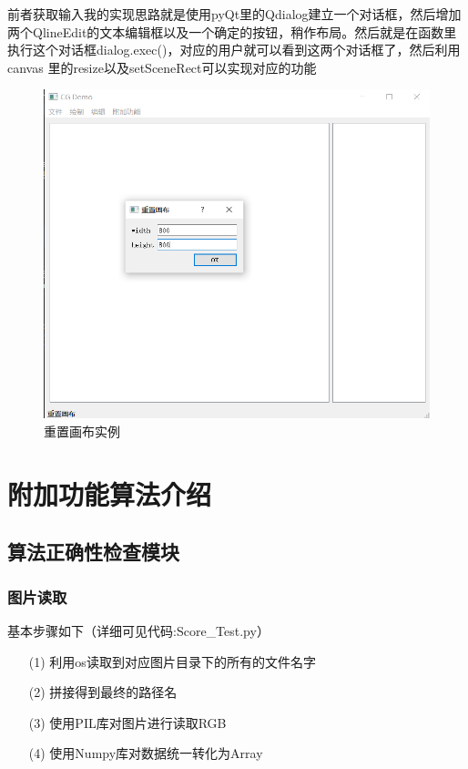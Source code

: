 \documentclass[a4paper,UTF8]{article}
\theoremstyle{definition}
\begin{document}
前者获取输入我的实现思路就是使用pyQt里的Qdialog建立一个对话框，然后增加
两个QlineEdit的文本编辑框以及一个确定的按钮，稍作布局。然后就是在函数里
执行这个对话框dialog.exec()，对应的用户就可以看到这两个对话框了，然后利用canvas
里的resize以及setSceneRect可以实现对应的功能
\begin{figure}[h]
	\centering
	\includegraphics[scale=0.4]{figure/resetwindow.png}
	\caption{重置画布实例}
	\label{fig:resetwindow}
\end{figure}

\section{附加功能算法介绍}
\subsection{算法正确性检查模块}
\subsubsection{图片读取}
基本步骤如下（详细可见代码:Score\_Test.py）

\begin{itemize}
    \item [(1)] 
    利用os读取到对应图片目录下的所有的文件名字
    \item [(2)]
    拼接得到最终的路径名
    \item [(3)]
    使用PIL库对图片进行读取RGB
    \item [(4)]
    使用Numpy库对数据统一转化为Array
  \end{itemize}
\end{document}
